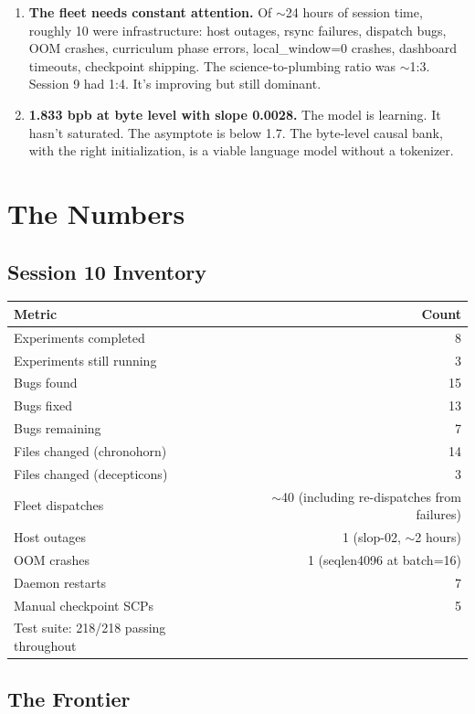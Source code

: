 \documentclass[11pt,a4paper]{report}
\begin{document}
\begin{enumerate}
\item \textbf{The fleet needs constant attention.} Of $\sim$24 hours of session time, roughly 10 were infrastructure: host outages, rsync failures, dispatch bugs, OOM crashes, curriculum phase errors, local\_window=0 crashes, dashboard timeouts, checkpoint shipping. The science-to-plumbing ratio was $\sim$1:3. Session 9 had 1:4. It's improving but still dominant.

\item \textbf{1.833 bpb at byte level with slope 0.0028.} The model is learning. It hasn't saturated. The asymptote is below 1.7. The byte-level causal bank, with the right initialization, is a viable language model without a tokenizer.
\end{enumerate}


\chapter{The Numbers}

\section{Session 10 Inventory}

\begin{center}
\begin{tabular}{lr}
\toprule
Metric & Count \\
\midrule
Experiments completed & 8 \\
Experiments still running & 3 \\
Bugs found & 15 \\
Bugs fixed & 13 \\
Bugs remaining & 7 \\
Files changed (chronohorn) & 14 \\
Files changed (decepticons) & 3 \\
Fleet dispatches & $\sim$40 (including re-dispatches from failures) \\
Host outages & 1 (slop-02, $\sim$2 hours) \\
OOM crashes & 1 (seqlen4096 at batch=16) \\
Daemon restarts & 7 \\
Manual checkpoint SCPs & 5 \\
Test suite: 218/218 passing throughout \\
\bottomrule
\end{tabular}
\end{center}

\section{The Frontier}
\end{document}
